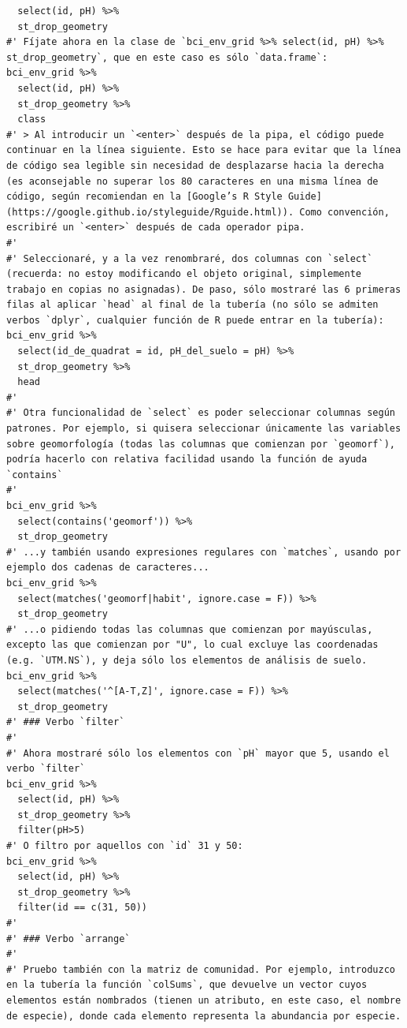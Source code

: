 \documentclass[11pt,]{article}
\begin{document}
\begin{verbatim}
  select(id, pH) %>%
  st_drop_geometry
#' Fíjate ahora en la clase de `bci_env_grid %>% select(id, pH) %>% st_drop_geometry`, que en este caso es sólo `data.frame`:
bci_env_grid %>%
  select(id, pH) %>%
  st_drop_geometry %>%
  class
#' > Al introducir un `<enter>` después de la pipa, el código puede continuar en la línea siguiente. Esto se hace para evitar que la línea de código sea legible sin necesidad de desplazarse hacia la derecha (es aconsejable no superar los 80 caracteres en una misma línea de código, según recomiendan en la [Google’s R Style Guide](https://google.github.io/styleguide/Rguide.html)). Como convención, escribiré un `<enter>` después de cada operador pipa.
#' 
#' Seleccionaré, y a la vez renombraré, dos columnas con `select` (recuerda: no estoy modificando el objeto original, simplemente trabajo en copias no asignadas). De paso, sólo mostraré las 6 primeras filas al aplicar `head` al final de la tubería (no sólo se admiten verbos `dplyr`, cualquier función de R puede entrar en la tubería):
bci_env_grid %>%
  select(id_de_quadrat = id, pH_del_suelo = pH) %>%
  st_drop_geometry %>%
  head
#' 
#' Otra funcionalidad de `select` es poder seleccionar columnas según patrones. Por ejemplo, si quisera seleccionar únicamente las variables sobre geomorfología (todas las columnas que comienzan por `geomorf`), podría hacerlo con relativa facilidad usando la función de ayuda `contains`
#' 
bci_env_grid %>%
  select(contains('geomorf')) %>%
  st_drop_geometry
#' ...y también usando expresiones regulares con `matches`, usando por ejemplo dos cadenas de caracteres...
bci_env_grid %>%
  select(matches('geomorf|habit', ignore.case = F)) %>%
  st_drop_geometry
#' ...o pidiendo todas las columnas que comienzan por mayúsculas, excepto las que comienzan por "U", lo cual excluye las coordenadas (e.g. `UTM.NS`), y deja sólo los elementos de análisis de suelo.
bci_env_grid %>%
  select(matches('^[A-T,Z]', ignore.case = F)) %>%
  st_drop_geometry
#' ### Verbo `filter`
#' 
#' Ahora mostraré sólo los elementos con `pH` mayor que 5, usando el verbo `filter`
bci_env_grid %>%
  select(id, pH) %>%
  st_drop_geometry %>%
  filter(pH>5)
#' O filtro por aquellos con `id` 31 y 50:
bci_env_grid %>%
  select(id, pH) %>%
  st_drop_geometry %>%
  filter(id == c(31, 50))
#' 
#' ### Verbo `arrange`
#' 
#' Pruebo también con la matriz de comunidad. Por ejemplo, introduzco en la tubería la función `colSums`, que devuelve un vector cuyos elementos están nombrados (tienen un atributo, en este caso, el nombre de especie), donde cada elemento representa la abundancia por especie.

\end{verbatim}
\end{document}
